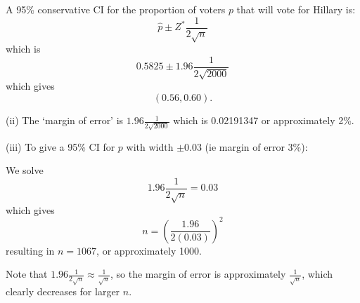 \documentclass[t,xcolor=pdftex,dvipsnames,table]{beamer}\usepackage[]{graphicx}\usepackage[]{color}
\begin{document}
\begin{frame}[fragile]{}

A 95\% conservative CI for the proportion of voters $p$ that will vote for Hillary is:
\[ \hat{p} \pm Z^{*} \frac{1}{2 \sqrt{n}} \]
which is
\[ 0.5825 \pm 1.96 \frac{1}{2 \sqrt{2000}} \]
which gives
\[ (0.56,0.60). \]

\vspace{.5cm}
(ii) The `margin of error' is $1.96 \frac{1}{2 \sqrt{2000}}$
which is 0.02191347 or approximately 2\%.

\end{frame}

\begin{frame}[fragile]{}

\vspace{.5cm}
(iii) To give a 95\% CI for $p$ with width $\pm 0.03$ (ie margin of error 3\%):

We solve \[ 1.96 \frac{1}{2 \sqrt{n}} = 0.03 \]
which gives
\[ n = (\frac{1.96}{2 (0.03)} )^2 \]
resulting in $n=1067$, or approximately 1000.

\vspace{.5cm}
Note that  $1.96 \frac{1}{2 \sqrt{n}} \approx \frac{1}{\sqrt{n}}$, so the margin of error is approximately $\frac{1}{\sqrt{n}}$, which clearly decreases for larger $n$.
\end{frame}
\end{document}
